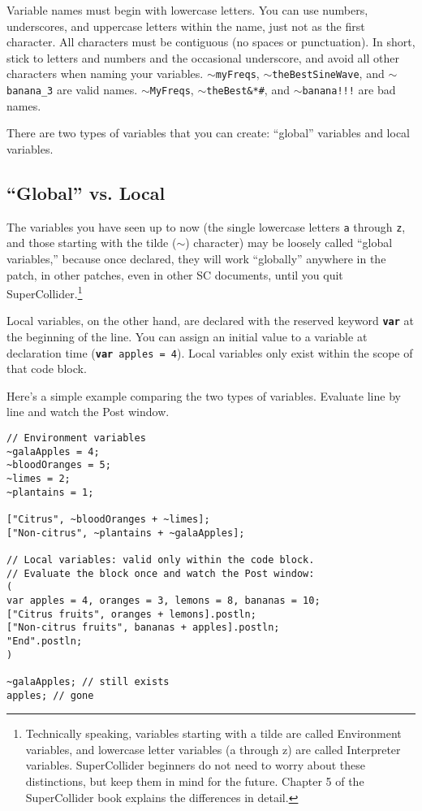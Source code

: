 Variable names must begin with lowercase letters. You can use numbers, underscores, and uppercase letters within the name, just not as the first character. All characters must be contiguous (no spaces or punctuation). In short, stick to letters and numbers and the occasional underscore, and avoid all other characters when naming your variables. \texttt{$\sim$myFreqs}, \texttt{$\sim$theBestSineWave}, and \texttt{$\sim$banana\_3} are valid names. \texttt{$\sim$MyFreqs}, \texttt{$\sim$theBest\&*\#\@SineWave}, and \texttt{$\sim$banana!!!} are bad names.

There are two types of variables that you can create: ``global'' variables and local variables.

\subsection{``Global'' vs. Local}

The variables you have seen up to now (the single lowercase letters \texttt{a} through \texttt{z}, and those starting with the tilde ($\sim$) character) may be loosely called ``global variables,'' because once declared, they will work ``globally'' anywhere in the patch, in other patches, even in other SC documents, until you quit SuperCollider.\footnote{Technically speaking, variables starting with a tilde are called Environment variables, and lowercase letter variables (a through z) are called Interpreter variables. SuperCollider beginners do not need to worry about these distinctions, but keep them in mind for the future. Chapter 5 of the SuperCollider book explains the differences in detail.}

Local variables, on the other hand, are declared with the reserved keyword \texttt{\textbf{var}} at the beginning of the line. You can assign an initial value to a variable at declaration time (\texttt{\textbf{var} apples = 4}). Local variables only exist within the scope of that code block.

Here's a simple example comparing the two types of variables. Evaluate line by line and watch the Post window.

 
\begin{lstlisting}[style=SuperCollider-IDE, basicstyle=\scttfamily\footnotesize]
// Environment variables
~galaApples = 4;
~bloodOranges = 5;
~limes = 2;
~plantains = 1;

["Citrus", ~bloodOranges + ~limes];
["Non-citrus", ~plantains + ~galaApples];

// Local variables: valid only within the code block.
// Evaluate the block once and watch the Post window:
(
var apples = 4, oranges = 3, lemons = 8, bananas = 10;
["Citrus fruits", oranges + lemons].postln;
["Non-citrus fruits", bananas + apples].postln;
"End".postln;
)

~galaApples; // still exists
apples; // gone
\end{lstlisting}


